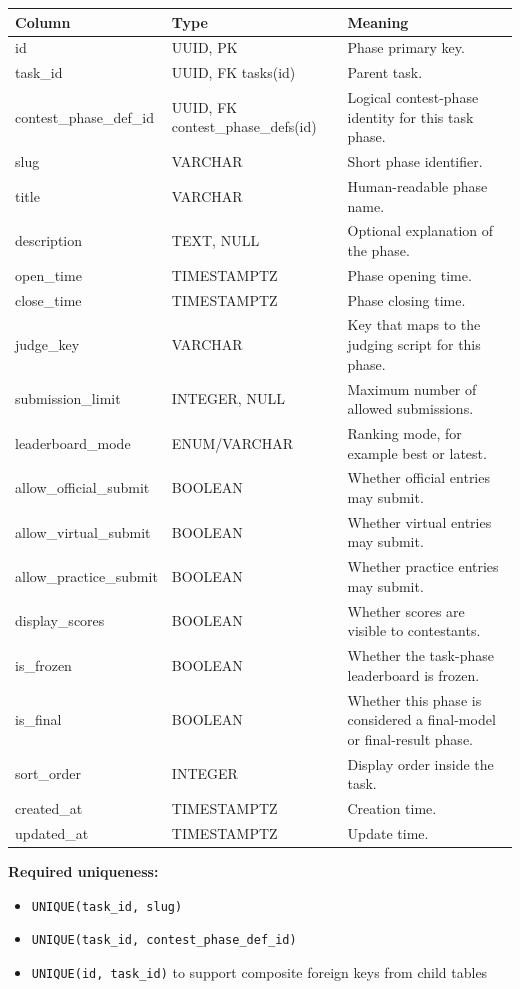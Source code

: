 \documentclass[11pt,a4paper]{article}
\begin{document}
\begin{longtable}{>{\raggedright\arraybackslash}p{} >{\raggedright\arraybackslash}p{} >{\raggedright\arraybackslash}p{}}
\toprule
\textbf{Column} & \textbf{Type} & \textbf{Meaning} \\
\midrule
id & UUID, PK & Phase primary key. \\
task\_id & UUID, FK tasks(id) & Parent task. \\
contest\_phase\_def\_id & UUID, FK contest\_phase\_defs(id) & Logical contest-phase identity for this task phase. \\
slug & VARCHAR & Short phase identifier. \\
title & VARCHAR & Human-readable phase name. \\
description & TEXT, NULL & Optional explanation of the phase. \\
open\_time & TIMESTAMPTZ & Phase opening time. \\
close\_time & TIMESTAMPTZ & Phase closing time. \\
judge\_key & VARCHAR & Key that maps to the judging script for this phase. \\
submission\_limit & INTEGER, NULL & Maximum number of allowed submissions. \\
leaderboard\_mode & ENUM/VARCHAR & Ranking mode, for example best or latest. \\
allow\_official\_submit & BOOLEAN & Whether official entries may submit. \\
allow\_virtual\_submit & BOOLEAN & Whether virtual entries may submit. \\
allow\_practice\_submit & BOOLEAN & Whether practice entries may submit. \\
display\_scores & BOOLEAN & Whether scores are visible to contestants. \\
is\_frozen & BOOLEAN & Whether the task-phase leaderboard is frozen. \\
is\_final & BOOLEAN & Whether this phase is considered a final-model or final-result phase. \\
sort\_order & INTEGER & Display order inside the task. \\
created\_at & TIMESTAMPTZ & Creation time. \\
updated\_at & TIMESTAMPTZ & Update time. \\
\bottomrule
\end{longtable}

\textbf{Required uniqueness:}
\begin{itemize}
    \item \texttt{UNIQUE(task\_id, slug)}
    \item \texttt{UNIQUE(task\_id, contest\_phase\_def\_id)}
    \item \texttt{UNIQUE(id, task\_id)} to support composite foreign keys from child tables
\end{itemize}
\end{document}
